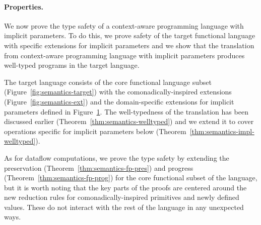 \begin{figure}[h!]
\label{fig:semantics-ext-impl}
\vspace{1em}
\end{figure}


\paragraph{Properties.}
We now prove the type safety of a context-aware programming language with implicit parameters.
To do this, we prove safety of the target functional language with specific extensions for implicit
parameters and we show that the translation from context-aware programming language with implicit
parameters produces well-typed programs in the target language.

The target language consists of the core functional language subset (Figure~\ref{fig:semantics-target})
with the comonadically-inspired extensions (Figure~\ref{fig:semantics-ext}) and the domain-specific
extensions for implicit parameters defined in Figure~\ref{fig:semantics-ext-impl}. The well-typedness
of the translation has been discussed earlier (Theorem~\ref{thm:semantics-welltyped}) and we extend
it to cover operations specific for implicit parameters below (Theorem~\ref{thm:semantics-impl-welltyped}).

As for dataflow computations, we prove the type safety by extending the preservation
(Theorem~\ref{thm:semantics-fp-pres}) and progress (Theorem~\ref{thm:semantics-fp-prog})
for the core functional subset of the language, but it is worth noting that the key parts of
the proofs are centered around the new reduction rules for comonadically-inspired primitives
and newly defined  values. These do not interact with the rest of the language in
any unexpected ways.

